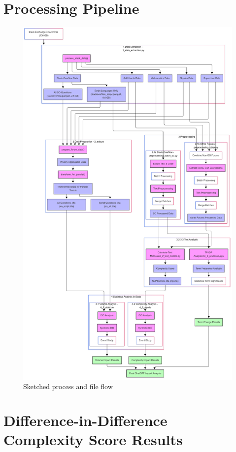 \section{Processing Pipeline}\label{app:procpipe}

\begin{figure}[htpb!]
    \centering
    \includegraphics[width=1\linewidth]{imgs/process_flow.png}
    \caption{Sketched process and file flow}
    \label{fig:app-process_flow}
\end{figure}


\section{Difference-in-Difference Complexity Score Results}\label{app:did}